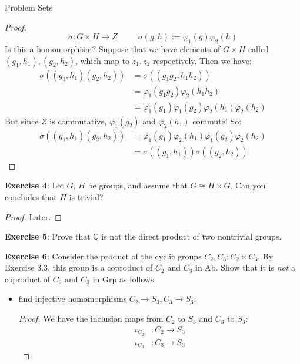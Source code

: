 \documentclass{report}
\begin{document}
\begin{exercises}{Problem Sets}
\begin{proof}
\begin{equation*}
                    \sigma: G \times H \rightarrow Z \hspace{30pt} \sigma(g, h) := \varphi_{1}(g)\varphi_{2}(h)
                \end{equation*}
            Is this a homomorphism? Suppose that we have elements of $G \times H$ called $(g_{1}, h_{1}), (g_{2}, h_{2})$, which map to $z_{1}, z_{2}$ respectively. Then we have:
                \begin{align*}
                    \sigma((g_{1}, h_{1})(g_{2}, h_{2})) &= \sigma((g_{1}g_{2}, h_{1}h_{2}))                                         \\
                                                         &= \varphi_{1}(g_{1}g_{2})\varphi_{2}(h_{1}h_{2})                           \\
                                                         &= \varphi_{1}(g_{1})\varphi_{1}(g_{2})\varphi_{2}(h_{1})\varphi_{2}(h_{2})
                \end{align*}
            But since $Z$ is commutative, $\varphi_{1}(g_{2})$ and $\varphi_{2}(h_{1})$ commute! So:
                \begin{align*}
                    \sigma((g_{1}, h_{1})(g_{2}, h_{2})) &= \varphi_{1}(g_{1})\varphi_{2}(h_{1})\varphi_{1}(g_{2})\varphi_{2}(h_{2}) \\
                                                         &= \sigma((g_{1}, h_{1}))\sigma((g_{2}, h_{2}))                               
                \end{align*}
        \end{proof}

    \textbf{Exercise 4}: Let $G$, $H$ be groups, and assume that $G \cong H \times G$. Can you concludes that $H$ is trivial?
        \begin{proof}
            Later.
        \end{proof}

    \textbf{Exercise 5}: Prove that $\mathbb{Q}$ is not the direct product of two nontrivial groups.

    \textbf{Exercise 6}: Consider the product of the cyclic groups $C_{2}, C_{3} : C_{2} \times C_{3}$. By Exercise 3.3, this group is a coproduct of $C_{2}$ and $C_{3}$ in $\text{Ab}$. Show that it is \textit{not} a coproduct of $C_{2}$ and $C_{3}$ in $\text{Grp}$ as follows:
        \begin{itemize}
            \item find injective homomorphisms $C_{2} \rightarrow S_{3}, C_{3} \rightarrow S_{3}$:
                \begin{proof}
                    We have the inclusion maps from $C_{2}$ to $S_{3}$ and $C_{3}$ to $S_{3}$:
                        \begin{align*}
                            \iota_{C_{2}} &: C_{2} \rightarrow S_{3} \\
                            \iota_{C_{3}} &: C_{3} \rightarrow S_{3}
                        \end{align*}
                \end{proof}


\end{itemize}
\end{exercises}
\end{document}
